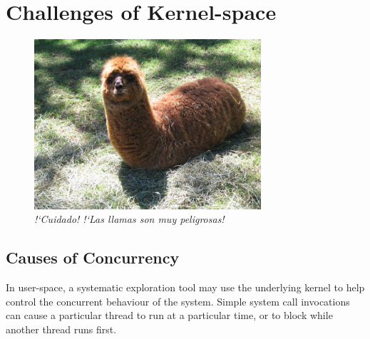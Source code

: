 \section{Challenges of Kernel-space}

\begin{figure}[h]
	\begin{center}
	\includegraphics[width=0.75\textwidth]{vip1066720.jpg}
	\end{center}
	\caption{{\em !`Cuidado! !`Las llamas son muy peligrosas!}\cite{de0u}}
\end{figure}

\subsection{Causes of Concurrency}

In user-space, a systematic exploration tool may use the underlying kernel to help control the concurrent behaviour of the system\cite{dbug-ssv}. Simple system call invocations can cause a particular thread to run at a particular time, or to block while another thread runs first.

